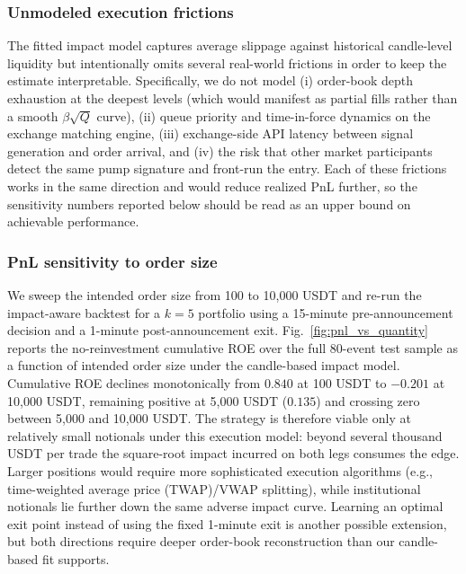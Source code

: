 \documentclass{ieeeaccess}
\begin{document}
\subsubsection{Unmodeled execution frictions}
The fitted impact model captures average slippage against historical candle-level liquidity but intentionally omits several real-world frictions in order to keep the estimate interpretable. Specifically, we do not model (i) order-book depth exhaustion at the deepest levels (which would manifest as partial fills rather than a smooth $\beta\sqrt{Q}$ curve), (ii) queue priority and time-in-force dynamics on the exchange matching engine, (iii) exchange-side API latency between signal generation and order arrival, and (iv) the risk that other market participants detect the same pump signature and front-run the entry. Each of these frictions works in the same direction and would reduce realized PnL further, so the sensitivity numbers reported below should be read as an upper bound on achievable performance.

\subsubsection{PnL sensitivity to order size}
We sweep the intended order size from 100 to 10{,}000 USDT and re-run the impact-aware backtest for a $k=5$ portfolio using a 15-minute pre-announcement decision and a 1-minute post-announcement exit. Fig.~\ref{fig:pnl_vs_quantity} reports the no-reinvestment cumulative ROE over the full 80-event test sample as a function of intended order size under the candle-based impact model. Cumulative ROE declines monotonically from $0.840$ at 100 USDT to $-0.201$ at 10{,}000 USDT, remaining positive at 5{,}000 USDT ($0.135$) and crossing zero between 5{,}000 and 10{,}000 USDT. The strategy is therefore viable only at relatively small notionals under this execution model: beyond several thousand USDT per trade the square-root impact incurred on both legs consumes the edge. Larger positions would require more sophisticated execution algorithms (e.g., time-weighted average price (TWAP)/VWAP splitting), while institutional notionals lie further down the same adverse impact curve. Learning an optimal exit point instead of using the fixed 1-minute exit is another possible extension, but both directions require deeper order-book reconstruction than our candle-based fit supports.
\end{document}
